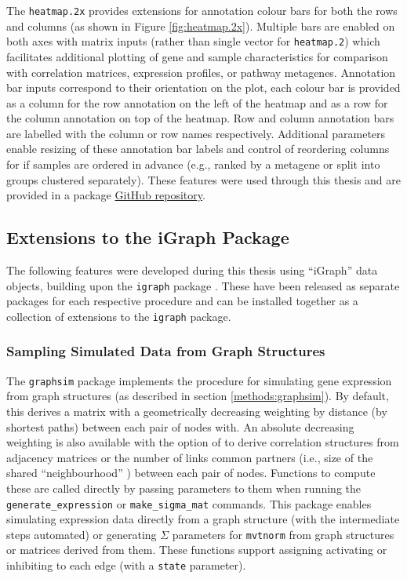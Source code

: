 The \texttt{heatmap.2x} provides extensions for annotation colour bars for both the rows and columns (as shown in Figure \ref{fig:heatmap.2x}). Multiple bars are enabled on both axes with matrix inputs (rather than single vector for \texttt{heatmap.2}) which facilitates additional plotting of gene and sample characteristics for comparison with correlation matrices, expression profiles, or pathway metagenes. Annotation bar inputs correspond to their orientation on the plot, each colour bar is provided as a column for the row annotation on the left of the heatmap and as a row for the column annotation on top of the heatmap. Row and column annotation bars are labelled with the column or row names respectively. Additional parameters enable resizing of these annotation bar labels and control of reordering columns for if samples are ordered in advance (e.g., ranked by a metagene or split into groups clustered separately).  These features were used through this thesis and are provided in a package \href{https://github.com/TomKellyGenetics/heatmap.2x}{GitHub repository}.


\FloatBarrier

\subsection{Extensions to the iGraph Package} \label{methods:igraph_extensions}
The following features were developed during this thesis using ``iGraph'' data objects, building upon the \texttt{igraph} package \citep{igraph}. These have been released as separate packages for each respective procedure and can be installed together as a collection of extensions to the \texttt{igraph} package.

\subsubsection{Sampling Simulated Data from Graph Structures}
The \texttt{graphsim} package implements the procedure for simulating gene expression from graph structures (as described in section \ref{methods:graphsim}). By default, this derives a matrix with a geometrically decreasing weighting by distance (by shortest paths) between each pair of nodes with. An absolute decreasing weighting is also available with the option of to derive correlation structures from adjacency matrices or the number of links common partners (i.e., size of the shared ``neighbourhood'' \citep{Hell1976}) between each pair of nodes. Functions to compute these are called directly by passing parameters to them when running the \texttt{generate\_expression} or \texttt{make\_sigma\_mat} commands. This package enables simulating expression data directly from a graph structure (with the intermediate steps automated) or generating $\Sigma$ parameters for \texttt{mvtnorm} from graph structures or matrices derived from them. These functions support assigning activating or inhibiting to each edge (with a \texttt{state} parameter).

